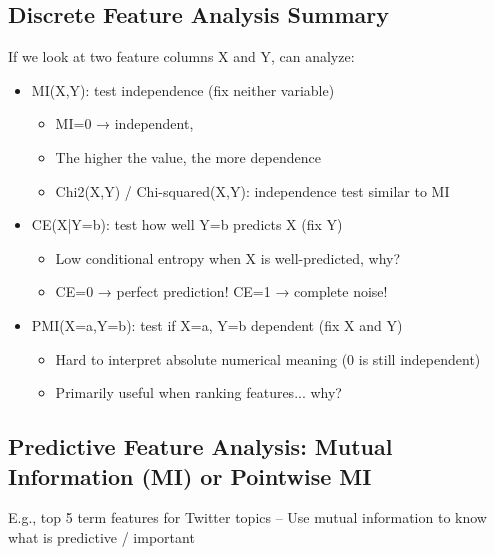 \documentclass[11pt]{article}
\theoremstyle{definition}
\begin{document}
\subsection{Discrete Feature Analysis Summary}
If we look at two feature columns X and Y, can analyze:
\begin{itemize}
  \item MI(X,Y): test independence (fix neither variable)
  \begin{itemize}
    \item MI=0 → independent,
    \item The higher the value, the more dependence
    \item Chi2(X,Y) / Chi-squared(X,Y): independence test similar to MI
  \end{itemize}
  \item CE(X|Y=b): test how well Y=b predicts X (fix Y)
  \begin{itemize}
    \item Low conditional entropy when X is well-predicted, why?
    \item CE=0 → perfect prediction! CE=1 → complete noise!
  \end{itemize}
  \item PMI(X=a,Y=b): test if X=a, Y=b dependent (fix X and Y)
  \begin{itemize}
    \item Hard to interpret absolute numerical meaning (0 is still independent)
    \item Primarily useful when ranking features... why?
  \end{itemize}
\end{itemize}
\subsection{Predictive Feature Analysis:
Mutual Information (MI) or Pointwise MI}
E.g., top 5 term features for Twitter topics
– Use mutual information to know what is
predictive / important
\end{document}
